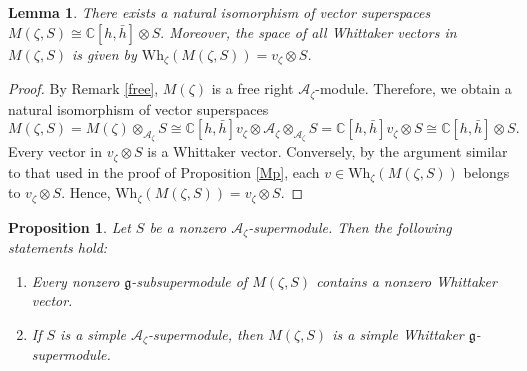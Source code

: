 \documentclass[a4paper,10pt]{article}
\theoremstyle{definition}
\theoremstyle{plain}
\newtheorem{proposition}[definition]{Proposition}
\newtheorem{lemma}[definition]{Lemma}
\theoremstyle{remark}
\theoremstyle{mystyle}
\numberwithin{equation}{section}
\begin{document}
\begin{lemma}\label{forfil}
     There exists a natural isomorphism of vector superspaces $M(\zeta,S)\cong \mathbb C[h,\bar h]\otimes S.$ Moreover, the space of all Whittaker vectors in \(M(\zeta,S)\) is given by $\mathrm{Wh}_{\zeta}(M(\zeta,S))=v_{\zeta}\otimes S$.
\end{lemma}
\begin{proof}
    By Remark \ref{free}, $M(\zeta)$ is a free right $\mathcal A_{\zeta}$-module. Therefore, we obtain a natural isomorphism of vector superspaces
    $$
    M(\zeta,S)=M(\zeta)\otimes _{\mathcal A_{\zeta}}S\cong \mathbb C[h,\bar h]v_{\zeta}\otimes \mathcal A_{\zeta}\otimes_{\mathcal A_{\zeta}} S=\mathbb C[h,\bar h]v_{\zeta}\otimes S\cong \mathbb C[h,\bar h]\otimes S.
    $$
    Every vector in $v_{\zeta}\otimes S$ is a Whittaker vector. Conversely, by the argument similar to that used in the proof of Proposition \ref{Mp}, each $v\in \mathrm{Wh}_{\zeta}(M(\zeta,S))$ belongs to $v_{\zeta}\otimes S$. Hence, $\mathrm{Wh}_{\zeta}(M(\zeta,S))=v_{\zeta}\otimes S$.
\end{proof}
\begin{proposition}\label{subm}
    Let \(S\) be a nonzero \(\mathcal A_\zeta\)-supermodule. Then the following statements hold:
    \begin{enumerate}
        \item[(1).] Every nonzero \(\mathfrak g\)-subsupermodule of \(M(\zeta,S)\) contains a nonzero Whittaker vector.
        \item[(2).] If \(S\) is a simple \(\mathcal A_\zeta\)-supermodule, then \(M(\zeta,S)\) is a simple Whittaker $\mathfrak g$-supermodule.
    \end{enumerate}
\end{proposition}
\end{document}
